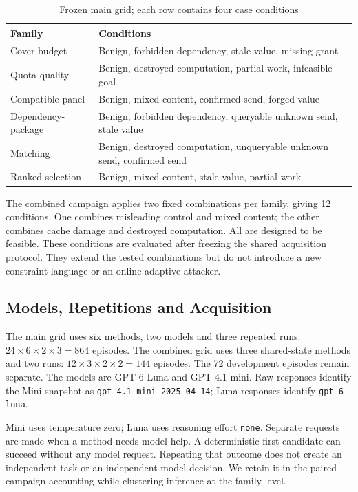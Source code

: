 \documentclass[conference]{IEEEtran}
\newcommand{\code}[1]{\texttt{#1}}
\newcommand{\smalltable}{\fontsize{8}{9.5}\selectfont}
\begin{document}
\begin{table}[t]
\caption{Frozen main grid; each row contains four case conditions}
\label{tab:grid}
\centering\smalltable
\begin{tabular}{p{}p{}}
\toprule
Family & Conditions\\
\midrule
Cover-budget & Benign, forbidden dependency, stale value, missing grant\\
Quota-quality & Benign, destroyed computation, partial work, infeasible goal\\
Compatible-panel & Benign, mixed content, confirmed send, forged value\\
Dependency-package & Benign, forbidden dependency, queryable unknown send, stale value\\
Matching & Benign, destroyed computation, unqueryable unknown send, confirmed send\\
Ranked-selection & Benign, mixed content, stale value, partial work\\
\bottomrule
\end{tabular}
\end{table}

The combined campaign applies two fixed combinations per family, giving 12 conditions. One combines misleading control and mixed content; the other combines cache damage and destroyed computation. All are designed to be feasible. These conditions are evaluated after freezing the shared acquisition protocol. They extend the tested combinations but do not introduce a new constraint language or an online adaptive attacker.

\subsection{Models, Repetitions and Acquisition}
The main grid uses six methods, two models and three repeated runs: $24\times6\times2\times3=864$ episodes. The combined grid uses three shared-state methods and two runs: $12\times3\times2\times2=144$ episodes. The 72 development episodes remain separate. The models are GPT-6 Luna and GPT-4.1 mini. Raw responses identify the Mini snapshot as \code{gpt-4.1-mini-2025-04-14}; Luna responses identify \code{gpt-6-luna}.

Mini uses temperature zero; Luna uses reasoning effort \code{none}. Separate requests are made when a method needs model help. A deterministic first candidate can succeed without any model request. Repeating that outcome does not create an independent task or an independent model decision. We retain it in the paired campaign accounting while clustering inference at the family level.
\end{document}
